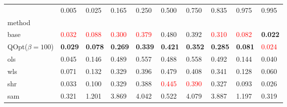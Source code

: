 \begin{tabular}{llllllllll}
\toprule
 & 0.005 & 0.025 & 0.165 & 0.250 & 0.500 & 0.750 & 0.835 & 0.975 & 0.995 \\
method &  &  &  &  &  &  &  &  &  \\
\midrule
base & \textcolor{red}{0.032} & \textcolor{red}{0.088} & \textcolor{red}{0.300} & \textcolor{red}{0.379} & 0.480 & 0.392 & \textcolor{red}{0.310} & \textcolor{red}{0.082} & \textbf{0.022} \\
\midrule
QOpt($\beta=100$) & \textbf{0.029} & \textbf{0.078} & \textbf{0.269} & \textbf{0.339} & \textbf{0.421} & \textbf{0.352} & \textbf{0.285} & \textbf{0.081} & \textcolor{red}{0.024} \\
ols & 0.045 & 0.146 & 0.489 & 0.557 & 0.488 & 0.558 & 0.492 & 0.144 & 0.040 \\
wls & 0.071 & 0.132 & 0.329 & 0.396 & 0.479 & 0.408 & 0.341 & 0.128 & 0.060 \\
shr & 0.033 & 0.100 & 0.329 & 0.388 & \textcolor{red}{0.445} & \textcolor{red}{0.390} & 0.327 & 0.093 & 0.026 \\
sam & 0.321 & 1.201 & 3.869 & 4.042 & 0.522 & 4.079 & 3.887 & 1.197 & 0.319 \\
\bottomrule
\end{tabular}